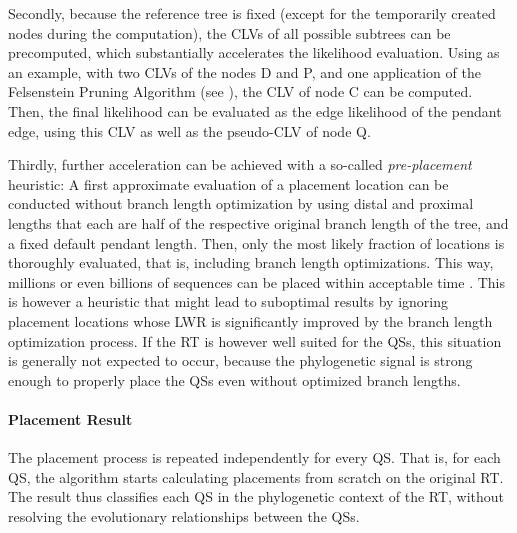 Secondly, because the reference tree is fixed (except for the temporarily created nodes during the computation),
the CLVs of all possible subtrees can be precomputed,
which substantially accelerates the likelihood evaluation.
Using  as an example,
with two CLVs of the nodes {\sffamily D} and {\sffamily P}, and one application of the Felsenstein Pruning Algorithm
(see ),
the CLV of node {\sffamily C} can be computed.
Then, the final likelihood can be evaluated as the edge likelihood of the pendant edge,
using this CLV as well as the pseudo-CLV of node {\sffamily Q}.

Thirdly, further acceleration can be achieved with a so-called \emph{pre-placement} heuristic:
A first approximate evaluation of a placement location can be conducted without branch length optimization by using
distal and proximal lengths that each are half of the respective original branch length of the tree,
and a fixed default pendant length.
Then, only the most likely fraction of locations is thoroughly evaluated, that is, including branch length optimizations.
This way, millions or even billions of sequences can be placed within acceptable time \cite{Barbera2018}.
This is however a heuristic that might lead to suboptimal results by ignoring placement locations
whose \ac{LWR} is significantly improved by the branch length optimization process.
If the \ac{RT} is however well suited for the \acp{QS}, this situation is generally not expected to occur,
because the phylogenetic signal is strong enough to properly place the \acp{QS} even without optimized branch lengths.

\paragraph{Placement Result}
\label{ch:Foundations:sec:PhylogeneticPlacement:sub:PipelineAndComputation:par:PlacementResults}

The placement process is repeated independently for every \ac{QS}.
That is, for each \ac{QS}, the algorithm starts calculating placements from scratch on the original \ac{RT}.
The result thus classifies each \ac{QS} in the phylogenetic context of the \ac{RT},
without resolving the evolutionary relationships between the \acp{QS}.


